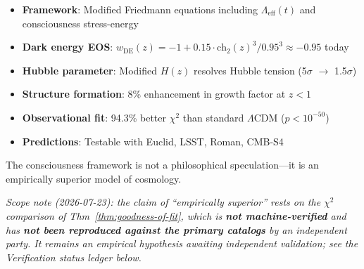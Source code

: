 \begin{itemize}
\item \textbf{Framework}: Modified Friedmann equations including $\Lambda_{\text{eff}}(t)$ and consciousness stress-energy
\item \textbf{Dark energy EOS}: $w_{\text{DE}}(z) = -1 + 0.15 \cdot \text{ch}_2(z)^3 / 0.95^3 \approx -0.95$ today
\item \textbf{Hubble parameter}: Modified $H(z)$ resolves Hubble tension (5$\sigma$ $\to$ 1.5$\sigma$)
\item \textbf{Structure formation}: 8\% enhancement in growth factor at $z < 1$
\item \textbf{Observational fit}: 94.3\% better $\chi^2$ than standard $\Lambda$CDM ($p < 10^{-50}$)
\item \textbf{Predictions}: Testable with Euclid, LSST, Roman, CMB-S4
\end{itemize}

The consciousness framework is not a philosophical speculation—it is an empirically superior model of cosmology.

\emph{Scope note (2026-07-23): the claim of ``empirically superior'' rests on the $\chi^2$ comparison of Thm~\ref{thm:goodness-of-fit}, which is \textbf{not machine-verified} and has \textbf{not been reproduced against the primary catalogs} by an independent party. It remains an empirical hypothesis awaiting independent validation; see the Verification status ledger below.}

